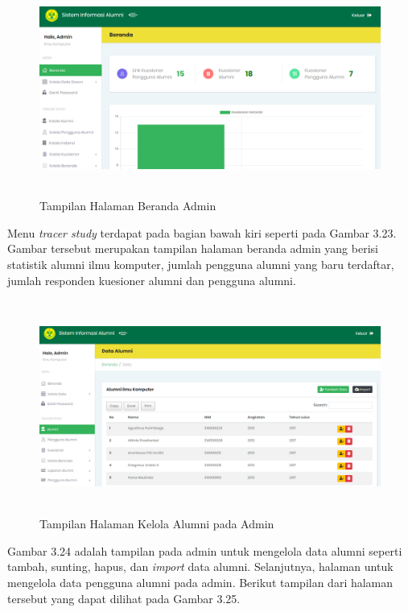 \begin{figure}[H]
	\centering
	\includegraphics[width=14cm,height=7cm]{gambar/tampilan/admin_beranda}
	\caption{Tampilan Halaman Beranda Admin}
	\label{ui_adminBeranda}
\end{figure}
 
Menu \textit{tracer study} terdapat pada bagian bawah kiri seperti pada Gambar 3.23. Gambar tersebut merupakan tampilan halaman beranda admin yang berisi statistik alumni ilmu komputer, jumlah pengguna alumni yang baru terdaftar, jumlah responden kuesioner alumni dan pengguna alumni. 

\begin{figure}[H]
	\centering
	\includegraphics[width=14cm,height=7cm]{gambar/tampilan/admin_kelolaAlumni}
	\caption{Tampilan Halaman Kelola Alumni pada Admin }
	\label{ui_adminKelolaAlumni}
\end{figure}

Gambar 3.24 adalah tampilan pada admin untuk mengelola data alumni seperti tambah, sunting, hapus, dan \textit{import} data alumni.  Selanjutnya, halaman untuk mengelola data pengguna alumni pada admin. Berikut tampilan dari halaman tersebut yang dapat dilihat pada Gambar 3.25.

